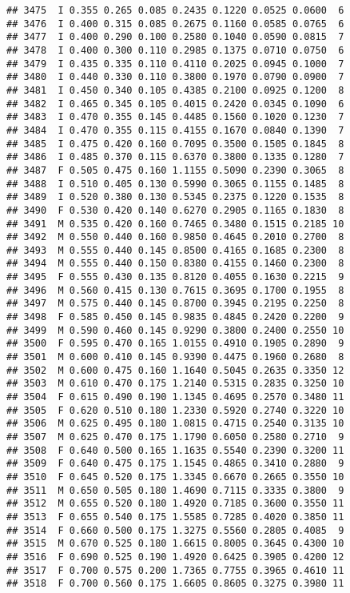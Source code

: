 \documentclass[
]{article}
\begin{document}
\begin{verbatim}
## 3475  I 0.355 0.265 0.085 0.2435 0.1220 0.0525 0.0600  6
## 3476  I 0.400 0.315 0.085 0.2675 0.1160 0.0585 0.0765  6
## 3477  I 0.400 0.290 0.100 0.2580 0.1040 0.0590 0.0815  7
## 3478  I 0.400 0.300 0.110 0.2985 0.1375 0.0710 0.0750  6
## 3479  I 0.435 0.335 0.110 0.4110 0.2025 0.0945 0.1000  7
## 3480  I 0.440 0.330 0.110 0.3800 0.1970 0.0790 0.0900  7
## 3481  I 0.450 0.340 0.105 0.4385 0.2100 0.0925 0.1200  8
## 3482  I 0.465 0.345 0.105 0.4015 0.2420 0.0345 0.1090  6
## 3483  I 0.470 0.355 0.145 0.4485 0.1560 0.1020 0.1230  7
## 3484  I 0.470 0.355 0.115 0.4155 0.1670 0.0840 0.1390  7
## 3485  I 0.475 0.420 0.160 0.7095 0.3500 0.1505 0.1845  8
## 3486  I 0.485 0.370 0.115 0.6370 0.3800 0.1335 0.1280  7
## 3487  F 0.505 0.475 0.160 1.1155 0.5090 0.2390 0.3065  8
## 3488  I 0.510 0.405 0.130 0.5990 0.3065 0.1155 0.1485  8
## 3489  I 0.520 0.380 0.130 0.5345 0.2375 0.1220 0.1535  8
## 3490  F 0.530 0.420 0.140 0.6270 0.2905 0.1165 0.1830  8
## 3491  M 0.535 0.420 0.160 0.7465 0.3480 0.1515 0.2185 10
## 3492  M 0.550 0.440 0.160 0.9850 0.4645 0.2010 0.2700  8
## 3493  M 0.555 0.440 0.145 0.8500 0.4165 0.1685 0.2300  8
## 3494  M 0.555 0.440 0.150 0.8380 0.4155 0.1460 0.2300  8
## 3495  F 0.555 0.430 0.135 0.8120 0.4055 0.1630 0.2215  9
## 3496  M 0.560 0.415 0.130 0.7615 0.3695 0.1700 0.1955  8
## 3497  M 0.575 0.440 0.145 0.8700 0.3945 0.2195 0.2250  8
## 3498  F 0.585 0.450 0.145 0.9835 0.4845 0.2420 0.2200  9
## 3499  M 0.590 0.460 0.145 0.9290 0.3800 0.2400 0.2550 10
## 3500  F 0.595 0.470 0.165 1.0155 0.4910 0.1905 0.2890  9
## 3501  M 0.600 0.410 0.145 0.9390 0.4475 0.1960 0.2680  8
## 3502  M 0.600 0.475 0.160 1.1640 0.5045 0.2635 0.3350 12
## 3503  M 0.610 0.470 0.175 1.2140 0.5315 0.2835 0.3250 10
## 3504  F 0.615 0.490 0.190 1.1345 0.4695 0.2570 0.3480 11
## 3505  F 0.620 0.510 0.180 1.2330 0.5920 0.2740 0.3220 10
## 3506  M 0.625 0.495 0.180 1.0815 0.4715 0.2540 0.3135 10
## 3507  M 0.625 0.470 0.175 1.1790 0.6050 0.2580 0.2710  9
## 3508  F 0.640 0.500 0.165 1.1635 0.5540 0.2390 0.3200 11
## 3509  F 0.640 0.475 0.175 1.1545 0.4865 0.3410 0.2880  9
## 3510  F 0.645 0.520 0.175 1.3345 0.6670 0.2665 0.3550 10
## 3511  M 0.650 0.505 0.180 1.4690 0.7115 0.3335 0.3800  9
## 3512  M 0.655 0.520 0.180 1.4920 0.7185 0.3600 0.3550 11
## 3513  F 0.655 0.540 0.175 1.5585 0.7285 0.4020 0.3850 11
## 3514  F 0.660 0.500 0.175 1.3275 0.5560 0.2805 0.4085  9
## 3515  M 0.670 0.525 0.180 1.6615 0.8005 0.3645 0.4300 10
## 3516  F 0.690 0.525 0.190 1.4920 0.6425 0.3905 0.4200 12
## 3517  F 0.700 0.575 0.200 1.7365 0.7755 0.3965 0.4610 11
## 3518  F 0.700 0.560 0.175 1.6605 0.8605 0.3275 0.3980 11

\end{verbatim}
\end{document}
